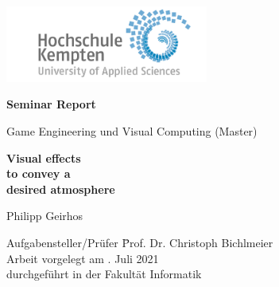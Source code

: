 \thispagestyle{empty}



\vspace*{-20mm}
\begin{flushright}
\includegraphics[width=0.5\textwidth]{Bilder/LogoHS.png}
\end{flushright}


\vspace*{2cm}

\begin{center}
{\Large \textbf{Seminar Report}}\\ 

\vspace*{1cm}


{\large Game Engineering und Visual Computing (Master)\\[1mm]}

\vspace{1cm}


{\Large \bfseries Visual effects \\ 
    to convey a \\
    desired atmosphere\\}


\vspace{1.5cm}

{\large Philipp Geirhos}\\[40mm]

\end{center}

\vfill

\parbox{120mm}{
\begin{tabbing}
Aufgabensteller/Prüfer \hspace{.7cm} \= Prof. Dr. Christoph Bichlmeier\\
Arbeit vorgelegt am                  . Juli 2021\\
durchgeführt in der                  \> Fakultät Informatik\\[4mm]
\end{tabbing}
}

